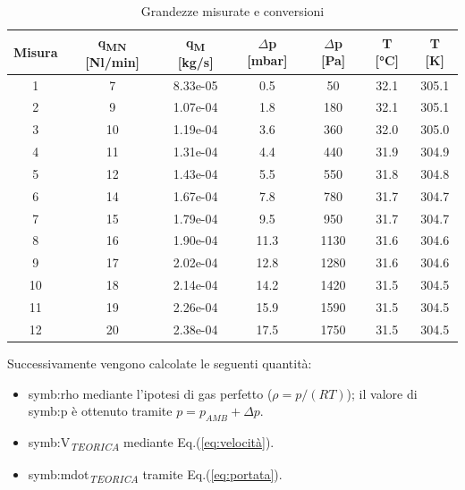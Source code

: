 \begin{table}[H]
	\centering
	\begin{tabular}{c|c|c|c|c|c|c}
		\toprule
		\toprule
		\textbf{Misura}& \textbf{q\textsubscript{MN} [Nl/min]}  & \textbf{q\textsubscript{M} [kg/s]}& \textbf{$\Delta$p [mbar]}  & \textbf{$\Delta$p [Pa]} & \textbf{T [°C]}  & \textbf{T [K] } \\
	\midrule
	\midrule
1  & 7  &8.33e-05 	& 0.5 & 50   & 32.1 & 305.1 \\
		\midrule
		2  & 9  &1.07e-04& 1.8 & 180  & 32.1 & 305.1 \\\midrule
		3  & 10 &1.19e-04& 3.6 & 360  & 32.0   & 305.0   \\\midrule
		4  & 11 &1.31e-04& 4.4 & 440  & 31.9 & 304.9 \\\midrule
		5  & 12 &1.43e-04& 5.5 & 550  & 31.8 & 304.8 \\\midrule
		6  & 14 &1.67e-04& 7.8 & 780  & 31.7 & 304.7 \\\midrule
		7  & 15 &1.79e-04& 9.5 & 950  & 31.7 & 304.7 \\\midrule
		8  & 16 &1.90e-04& 11.3 & 1130 & 31.6 & 304.6 \\\midrule
		9  & 17 &2.02e-04& 12.8 & 1280 & 31.6 & 304.6 \\\midrule
		10 & 18 &2.14e-04& 14.2 & 1420 & 31.5 & 304.5 \\\midrule
		11 & 19 &2.26e-04& 15.9 & 1590 & 31.5 & 304.5 \\\midrule
		12 & 20 &2.38e-04& 17.5 & 1750 & 31.5 & 304.5 \\
		\bottomrule
		\bottomrule
	\end{tabular}
	\caption{Grandezze misurate e conversioni}
	\label{tab:dati}
\end{table}

Successivamente vengono calcolate le seguenti quantità:
\begin{itemize}
	\item \gls{symb:rho} mediante l'ipotesi di gas perfetto ($\rho = p/(RT)$); il valore di \gls{symb:p} è ottenuto tramite $p=p_{\textit{AMB}}+\Delta p$.
	\item \gls{symb:V}\textsubscript{\textit{TEORICA}} mediante Eq.(\ref{eq:velocità}).
	\item \gls{symb:mdot}\textsubscript{\textit{TEORICA}} tramite Eq.(\ref{eq:portata}).
\end{itemize}


